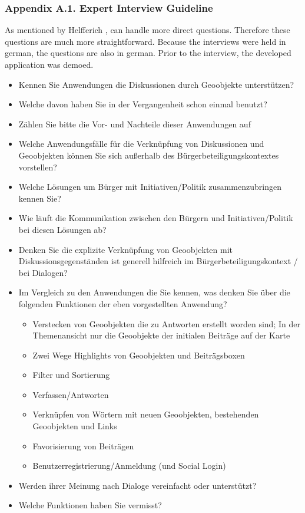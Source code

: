\documentclass{sigchi}
\begin{document}
\subsubsection{Appendix A.1. Expert Interview Guideline}

As mentioned by Helfferich \cite{helfferich2005}, can handle more direct questions. Therefore these questions are much more straightforward. Because the interviews were held in german, the questions are also in german. Prior to the interview, the developed application was demoed.
\begin{itemize}
    \item Kennen Sie Anwendungen die Diskussionen durch Geoobjekte unterst{\"u}tzen?
    \item Welche davon haben Sie in der Vergangenheit schon einmal benutzt?
    \item Z{\"a}hlen Sie bitte die Vor- und Nachteile dieser Anwendungen auf
    \item Welche Anwendungsf{\"a}lle f{\"u}r die Verkn{\"u}pfung von Diskussionen und Geoobjekten k{\"o}nnen Sie sich außerhalb des B{\"u}rgerbeteiligungskontextes vorstellen?
    \item Welche L{\"o}sungen um B{\"u}rger mit Initiativen/Politik zusammenzubringen kennen Sie?
    \item Wie l{\"a}uft die Kommunikation zwischen den B{\"u}rgern und Initiativen/Politik bei diesen L{\"o}sungen ab?
    \item Denken Sie die explizite Verkn{\"u}pfung von Geoobjekten mit Diskussionsgegenst{\"a}nden ist generell hilfreich im B{\"u}rgerbeteiligungskontext / bei Dialogen?
    \item Im Vergleich zu den Anwendungen die Sie kennen, was denken Sie {\"u}ber die folgenden Funktionen der eben vorgestellten Anwendung?
        \begin{itemize}
            \item Verstecken von Geoobjekten die zu Antworten erstellt worden sind; In der Themenansicht nur die Geoobjekte der initialen Beitr{\"a}ge auf der Karte
            \item Zwei Wege Highlights von Geoobjekten und Beitr{\"a}gsboxen
            \item Filter und Sortierung
            \item Verfassen/Antworten
            \item Verkn{\"u}pfen von W{\"o}rtern mit neuen Geoobjekten, bestehenden Geoobjekten und Links
            \item Favorisierung von Beitr{\"a}gen
            \item Benutzerregistrierung/Anmeldung (und Social Login)
        \end{itemize}
    \item Werden ihrer Meinung nach Dialoge vereinfacht oder unterst{\"u}tzt?
    \item Welche Funktionen haben Sie vermisst?

\end{itemize}
\end{document}
